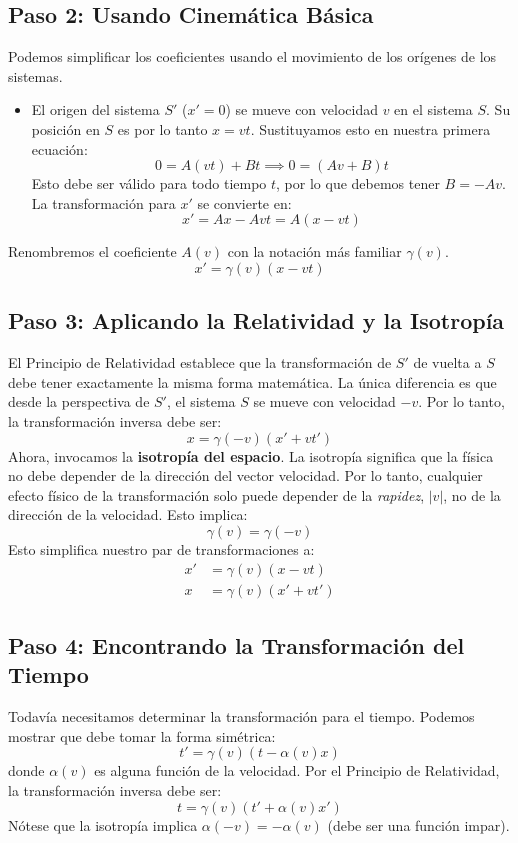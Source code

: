 \documentclass[11pt,a4paper]{article}
\begin{document}
\subsection{Paso 2: Usando Cinemática Básica}
Podemos simplificar los coeficientes usando el movimiento de los orígenes de los sistemas.
\begin{itemize}
    \item El origen del sistema $S'$ ($x'=0$) se mueve con velocidad $v$ en el sistema $S$. Su posición en $S$ es por lo tanto $x=vt$. Sustituyamos esto en nuestra primera ecuación:
    \[ 0 = A(vt) + Bt \implies 0 = (Av+B)t \]
    Esto debe ser válido para todo tiempo $t$, por lo que debemos tener $B = -Av$. La transformación para $x'$ se convierte en:
    \[ x' = Ax - Avt = A(x-vt) \]
\end{itemize}
Renombremos el coeficiente $A(v)$ con la notación más familiar $\gamma(v)$.
\begin{equation} \label{eq:x_prime}
x' = \gamma(v)(x - vt)
\end{equation}

\subsection{Paso 3: Aplicando la Relatividad y la Isotropía}
El Principio de Relatividad establece que la transformación de $S'$ de vuelta a $S$ debe tener exactamente la misma forma matemática. La única diferencia es que desde la perspectiva de $S'$, el sistema $S$ se mueve con velocidad $-v$. Por lo tanto, la transformación inversa debe ser:
\begin{equation} \label{eq:x}
x = \gamma(-v)(x' + vt')
\end{equation}
Ahora, invocamos la \textbf{isotropía del espacio}. La isotropía significa que la física no debe depender de la dirección del vector velocidad. Por lo tanto, cualquier efecto físico de la transformación solo puede depender de la \textit{rapidez}, $|v|$, no de la dirección de la velocidad. Esto implica:
\[ \gamma(v) = \gamma(-v) \]
Esto simplifica nuestro par de transformaciones a:
\begin{align*}
x' &= \gamma(v)(x - vt) \\
x &= \gamma(v)(x' + vt')
\end{align*}

\subsection{Paso 4: Encontrando la Transformación del Tiempo}
Todavía necesitamos determinar la transformación para el tiempo. Podemos mostrar que debe tomar la forma simétrica:
\begin{equation} \label{eq:t_prime}
t' = \gamma(v)(t - \alpha(v) x)
\end{equation}
donde $\alpha(v)$ es alguna función de la velocidad. Por el Principio de Relatividad, la transformación inversa debe ser:
\begin{equation} \label{eq:t}
t = \gamma(v)(t' + \alpha(v) x')
\end{equation}
Nótese que la isotropía implica $\alpha(-v) = -\alpha(v)$ (debe ser una función impar).
\end{document}
